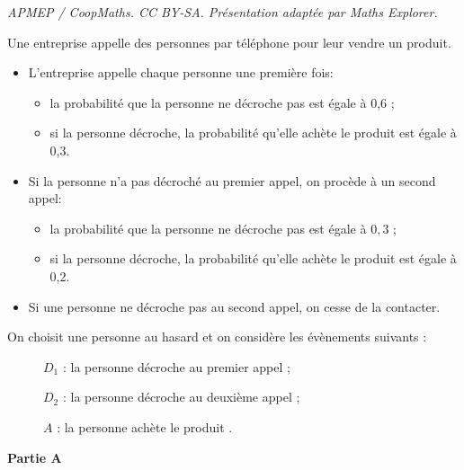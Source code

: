 \documentclass[10pt]{article}
\begin{document}
\noindent\textit{APMEP / CoopMaths. CC BY-SA. Présentation adaptée par Maths Explorer.}\par\medskip
\medskip

Une entreprise appelle des personnes par téléphone pour leur vendre un produit. 

\begin{itemize}
\item L'entreprise appelle chaque personne une première fois:
\begin{itemize}
\item[$\bullet~~$]la probabilité que la personne ne décroche pas est égale à 0,6 ;
\item[$\bullet~~$]si la personne décroche, la probabilité qu'elle achète le produit est égale à 0,3.
\end{itemize}
\item Si la personne n'a pas décroché au premier appel, on procède à un second appel: 
\begin{itemize}
\item[$\bullet~~$]la probabilité que la personne ne décroche pas est égale à $0,3$ ;
\item[$\bullet~~$]si la personne décroche, la probabilité qu'elle achète le produit est égale à 0,2.
\end{itemize}
\item Si une personne ne décroche pas au second appel, on cesse de la contacter.
\end{itemize}

\medskip

On choisit une personne au hasard et on considère les évènements suivants : 

\begin{description}
\item[ ] $D_1$ : \og la personne décroche au premier appel\fg{} ;
\item[ ] $D_2$ : \og la personne décroche au deuxième appel\fg{} ;
\item[ ] $A$ : \og la personne achète le produit \fg.
\end{description}



\bigskip

\textbf{Partie A}
\end{document}

